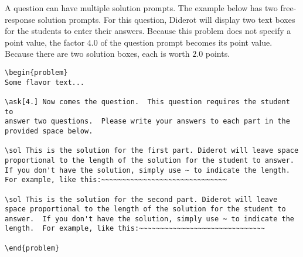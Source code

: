 \begin{example}

A question can have multiple solution prompts.  The example below has
two free-response solution prompts. For this question, Diderot will
display two text boxes for the students to enter their answers.
%
Because this problem does not specify a point value, the factor $4.0$
of the question prompt becomes its point value.
%
Because there are two solution boxes, each is worth $2.0$ points.

\begin{lstlisting}
\begin{problem}
Some flavor text...

\ask[4.] Now comes the question.  This question requires the student to
answer two questions.  Please write your answers to each part in the
provided space below.

\sol This is the solution for the first part. Diderot will leave space
proportional to the length of the solution for the student to answer.
If you don't have the solution, simply use ~ to indicate the length.
For example, like this:~~~~~~~~~~~~~~~~~~~~~~~~~~~~~~

\sol This is the solution for the second part. Diderot will leave
space proportional to the length of the solution for the student to
answer.  If you don't have the solution, simply use ~ to indicate the
length.  For example, like this:~~~~~~~~~~~~~~~~~~~~~~~~~~~~~~

\end{problem}
\end{lstlisting}

\end{example}

